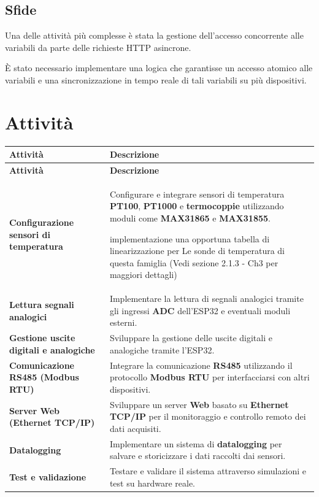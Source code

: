 \documentclass[12pt,a4paper]{report}
\begin{document}
\section{Sfide}
Una delle attività più complesse è stata la gestione dell'accesso concorrente alle variabili da parte delle richieste HTTP asincrone.

È stato necessario implementare una logica che garantisse un accesso atomico alle variabili e una sincronizzazione in tempo reale di tali variabili su più dispositivi.



\chapter{Attività}

\begin{longtable}{|p{}|p{}|}
\hline
\textbf{Attività} & \textbf{Descrizione} \\ \hline
\endfirsthead
\hline
\textbf{Attività} & \textbf{Descrizione} \\ \hline
\endhead
\hline
\endfoot
\textbf{Configurazione sensori di temperatura} & Configurare e integrare sensori di temperatura \textbf{PT100}, \textbf{PT1000} e \textbf{termocoppie} utilizzando moduli come \textbf{MAX31865} e \textbf{MAX31855}.

 implementazione una opportuna tabella di linearizzazione per Le sonde di temperatura di questa famiglia (Vedi sezione 2.1.3 - Ch3 per maggiori dettagli)  \\ \hline

\textbf{Lettura segnali analogici} & Implementare la lettura di segnali analogici tramite gli ingressi \textbf{ADC} dell'ESP32 e eventuali moduli esterni. \\ \hline
\textbf{Gestione uscite digitali e analogiche} & Sviluppare la gestione delle uscite digitali e analogiche tramite l'ESP32. \\ \hline
\textbf{Comunicazione RS485 (Modbus RTU)} & Integrare la comunicazione \textbf{RS485} utilizzando il protocollo \textbf{Modbus RTU} per interfacciarsi con altri dispositivi. \\ \hline
\textbf{Server Web (Ethernet TCP/IP)} & Sviluppare un server \textbf{Web} basato su \textbf{Ethernet TCP/IP} per il monitoraggio e controllo remoto dei dati acquisiti. \\ \hline
\textbf{Datalogging} & Implementare un sistema di \textbf{datalogging} per salvare e storicizzare i dati raccolti dai sensori. \\ \hline
\textbf{Test e validazione} & Testare e validare il sistema attraverso simulazioni e test su hardware reale. \\ \hline
\end{longtable}
\end{document}
